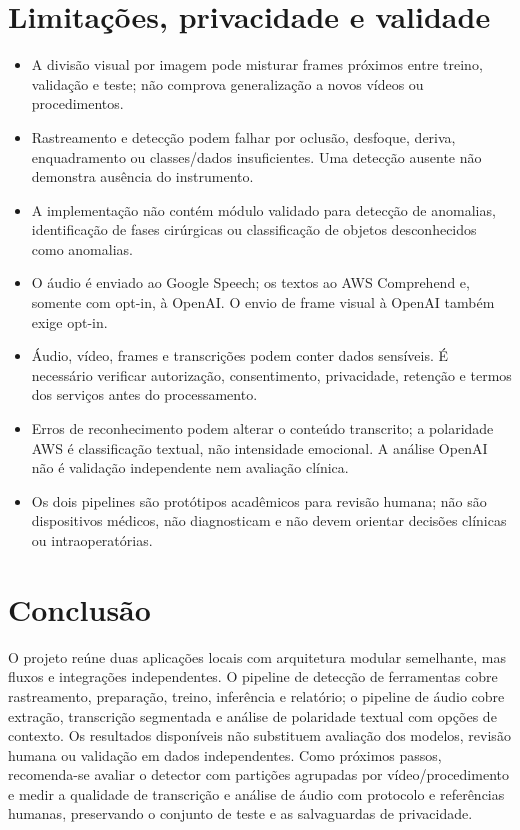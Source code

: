 \documentclass[12pt,a4paper]{article}
\begin{document}
\section{Limitações, privacidade e validade}

\begin{itemize}
  \item A divisão visual por imagem pode misturar frames próximos entre treino, validação e teste; não comprova generalização a novos vídeos ou procedimentos.
  \item Rastreamento e detecção podem falhar por oclusão, desfoque, deriva, enquadramento ou classes/dados insuficientes. Uma detecção ausente não demonstra ausência do instrumento.
  \item A implementação não contém módulo validado para detecção de anomalias, identificação de fases cirúrgicas ou classificação de objetos desconhecidos como anomalias.
  \item O áudio é enviado ao Google Speech; os textos ao AWS Comprehend e, somente com opt-in, à OpenAI. O envio de frame visual à OpenAI também exige opt-in.
  \item Áudio, vídeo, frames e transcrições podem conter dados sensíveis. É necessário verificar autorização, consentimento, privacidade, retenção e termos dos serviços antes do processamento.
  \item Erros de reconhecimento podem alterar o conteúdo transcrito; a polaridade AWS é classificação textual, não intensidade emocional. A análise OpenAI não é validação independente nem avaliação clínica.
  \item Os dois pipelines são protótipos acadêmicos para revisão humana; não são dispositivos médicos, não diagnosticam e não devem orientar decisões clínicas ou intraoperatórias.
\end{itemize}

\section{Conclusão}

O projeto reúne duas aplicações locais com arquitetura modular semelhante, mas fluxos e integrações independentes. O pipeline de detecção de ferramentas cobre rastreamento, preparação, treino, inferência e relatório; o pipeline de áudio cobre extração, transcrição segmentada e análise de polaridade textual com opções de contexto. Os resultados disponíveis não substituem avaliação dos modelos, revisão humana ou validação em dados independentes. Como próximos passos, recomenda-se avaliar o detector com partições agrupadas por vídeo/procedimento e medir a qualidade de transcrição e análise de áudio com protocolo e referências humanas, preservando o conjunto de teste e as salvaguardas de privacidade.
\end{document}
